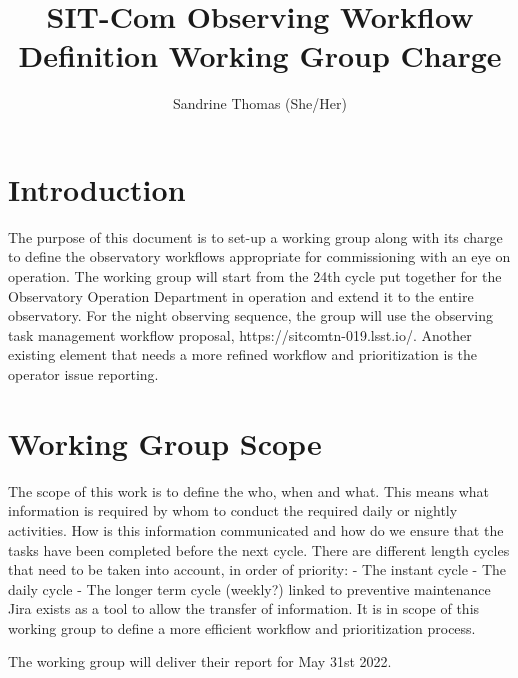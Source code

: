 \documentclass[SE,authoryear,toc]{lsstdoc}
\title{SIT-Com Observing Workflow Definition Working Group Charge}
\author{%
Sandrine Thomas (She/Her)
}
\date{\vcsDate}
\begin{document}
\maketitle



\section{Introduction}
The purpose of this document is to set-up a working group along with its charge to define the observatory workflows appropriate for commissioning with an eye on operation. The working group will start from the 24th cycle put together for the Observatory Operation Department in operation and extend it to the entire observatory. 
For the night observing sequence, the group will use the observing task management workflow proposal, https://sitcomtn-019.lsst.io/. 
Another existing element that needs a more refined workflow and prioritization is the operator issue reporting.

\section{Working Group Scope}
The scope of this work is to define the who, when and what. This means what information is required by whom to conduct the required daily or nightly activities. How is this information communicated and how do we ensure that the tasks have been completed before the next cycle. 
There are different length cycles that need to be taken into account, in order of priority: 
- The instant cycle 
- The daily cycle
- The longer term cycle (weekly?) linked to preventive maintenance
Jira exists as a tool to allow the transfer of information. It is in scope of this working group to define a more efficient workflow and prioritization process. 

The working group will deliver their report for May 31st 2022.
\end{document}
